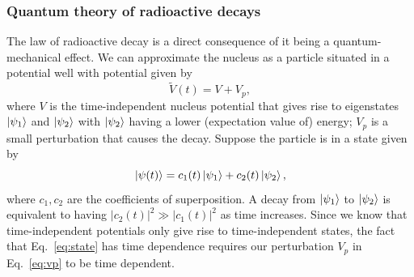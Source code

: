 \documentclass[nofootinbib,preprint,aps]{revtex4-1}
\begin{document}
        \subsubsection{Quantum theory of radioactive decays}
        The law of radioactive decay is a direct consequence of it being a quantum-mechanical
        effect.
        We can approximate the nucleus as a particle situated in a potential well with potential given by
        \begin{equation}
            \label{eq:vp}
            \tilde{V}(t) = V + V_p,
        \end{equation}
        where $V$ is the time-independent nucleus potential that gives rise to eigenstates $\ket{\psi_1}$
        and $\ket{\psi_2}$ with $\ket{\psi_2}$ having a lower (expectation value of) energy; $V_p$ is a small
        perturbation that causes the decay.
        Suppose the particle is in a state given by
        \begin{equation}
            \label{eq:state}
            \ket{\psi(t)} = c_1(t)\ket{\psi_1} + c_2(t)\ket{\psi_2},
        \end{equation}
        where $c_1,c_2$ are the coefficients of superposition.
        A decay from $\ket{\psi_1}$ to $\ket{\psi_2}$ is equivalent to
        having $|c_2(t)|^2\gg |c_1(t)|^2$ as time increases. Since we know that time-independent potentials
        only give rise to time-independent states, the fact that Eq.~\ref{eq:state} has time dependence requires
        our perturbation $V_p$ in Eq.~\ref{eq:vp} to be time dependent.
        
\end{document}

